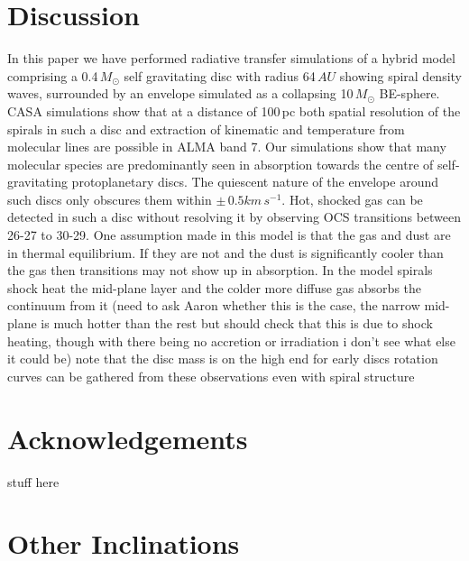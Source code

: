 \documentclass[useAMS,usenatbib]{mn2e}
\begin{document}
\section{Discussion}

In this paper we have performed radiative transfer simulations of a hybrid model comprising a 0.4$\, M_\odot$ self gravitating disc with radius 64$\,AU$ showing spiral density waves, surrounded by an envelope simulated as a collapsing 10$\,M_\odot$ BE-sphere. CASA simulations show that at a distance of 100$\,$pc both spatial resolution of the spirals in such a disc and extraction of kinematic and temperature from molecular lines are possible in ALMA band 7. Our simulations show that many  molecular species are predominantly seen in absorption towards the centre of  self-gravitating protoplanetary discs.\newline
The quiescent nature of the envelope around such discs only obscures them within $\pm\,0.5 km\,s^{-1}$.\newline
Hot, shocked gas can be detected in such a disc without resolving it by observing OCS transitions between 26-27 to 30-29.\newline
One assumption made in this model is that the gas and dust are in thermal equilibrium. If they are not and the dust is significantly cooler than the gas then transitions may not show up in absorption. In the model spirals shock heat the mid-plane layer and the colder more diffuse gas absorbs the continuum from it (need to ask Aaron whether this is the case, the narrow mid-plane is much hotter than the rest but should check that this is due to shock heating, though with there being no accretion or irradiation i don't see what else it could be)\newline
note that the disc mass is on the high end for early discs\newline
rotation curves can be gathered from these observations even with spiral structure\newline




\section*{Acknowledgements}

stuff here
\newpage


\appendix

\section[]{Other Inclinations}
\end{document}
